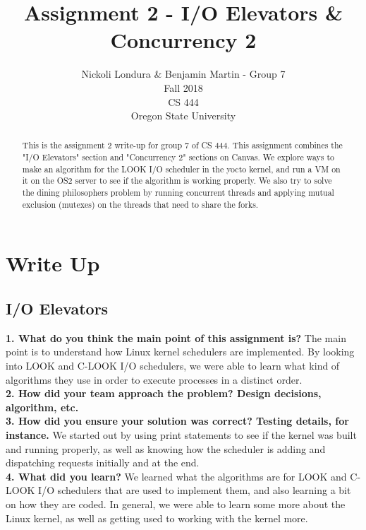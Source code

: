 \documentclass[10pt,english]{IEEEtran}
\title{Assignment 2 - I/O Elevators \& Concurrency 2}
\author{Nickoli Londura \& Benjamin Martin - Group 7 \\ Fall 2018 \\ CS 444 \\ Oregon State University}
\begin{document}
\maketitle

\begin{abstract}

\noindent This is the assignment 2 write-up for group 7 of CS 444. This assignment combines the "I/O Elevators" section and "Concurrency 2" sections on Canvas. We explore ways to make an algorithm for the LOOK I/O scheduler in the yocto kernel, and run a VM on it on the OS2 server to see if the algorithm is working properly. We also try to solve the dining philosophers problem by running concurrent threads and applying mutual exclusion (mutexes) on the threads that need to share the forks.

\end{abstract}

\newpage

\section{Write Up}
\subsection{I/O Elevators}

\textbf{1. What do you think the main point of this assignment is?}
The main point is to understand how Linux kernel schedulers are implemented. By looking into LOOK and C-LOOK I/O schedulers, we were able to learn what kind of algorithms they use in order to execute processes in a distinct order.  \\


\noindent \textbf{2. How did your team approach the problem? Design decisions, algorithm, etc.}
  \\


\noindent \textbf{3. How did you ensure your solution was correct? Testing details, for instance.}
We started out by using print statements to see if the kernel was built and running properly, as well as knowing how the scheduler is adding and dispatching requests initially and at the end.  \\


\noindent \textbf{4. What did you learn?}
We learned what the algorithms are for LOOK and C-LOOK I/O schedulers that are used to implement them, and also learning a bit on how they are coded. In general, we were able to learn some more about the Linux kernel, as well as getting used to working with the kernel more.  \\
\end{document}
